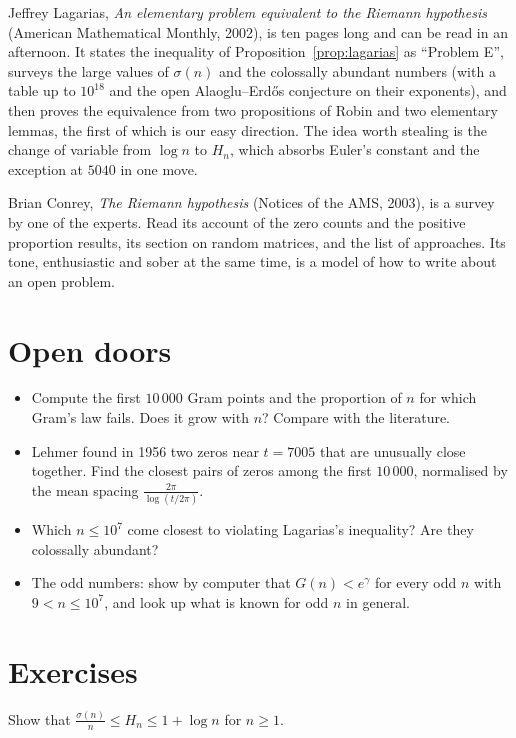 Jeffrey Lagarias, \emph{An elementary problem equivalent to the Riemann hypothesis} (American Mathematical Monthly, 2002), is ten pages long and can be
read in an afternoon. It states the inequality of Proposition~\ref{prop:lagarias} as ``Problem E'', surveys the large values of $\sigma(n)$ and the colossally
abundant numbers (with a table up to $10^{18}$ and the open Alaoglu--Erd\H{o}s conjecture on their exponents), and then proves the equivalence from two
propositions of Robin and two elementary lemmas, the first of which is our easy direction. The idea worth stealing is the change of variable from
$\log n$ to $H_n$, which absorbs Euler's constant and the exception at $5040$ in one move.

Brian Conrey, \emph{The Riemann hypothesis} (Notices of the AMS, 2003), is a survey by one of the experts. Read its account of the zero counts and the
positive proportion results, its section on random matrices, and the list of approaches. Its tone, enthusiastic and sober at the same time, is a model
of how to write about an open problem.

\section{Open doors}

\begin{itemize}
\item Compute the first $10\,000$ Gram points and the proportion of $n$ for which Gram's law fails. Does it grow with $n$? Compare with the literature.
\item Lehmer found in 1956 two zeros near $t=7005$ that are unusually close together. Find the closest pairs of zeros among the first $10\,000$, normalised
by the mean spacing $\frac{2\pi}{\log(t/2\pi)}$.
\item Which $n\le10^7$ come closest to violating Lagarias's inequality? Are they colossally abundant?
\item The odd numbers: show by computer that $G(n)<e^\gamma$ for every odd $n$ with $9<n\le10^7$, and look up what is known for odd $n$ in general.
\end{itemize}

\section{Exercises}

\begin{exercise}[$\star$]\label{ex:sigmaH}
Show that $\frac{\sigma(n)}n\le H_n\le1+\log n$ for $n\ge1$.
\end{exercise}

